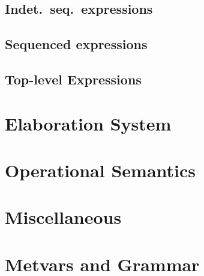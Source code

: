 \documentclass[11pt]{article}%
\newcommand{\TODO}[1]{}
\begin{document}
\subsection{Indet.\ seq.\ expressions}
\cndefnsexplXXisXXexpr%

\subsection{Sequenced expressions}
\cndefnsexplXXseqXXexpr%

\subsection{Top-level Expressions}
\cndefnsexplXXtop%

\section{Elaboration System}
\cndefnsinfXXres%
\cndefnselabXXisXXexpr%
\cndefnselabXXspine%
\cndefnselabXXseqXXexpr%
\cndefnselabXXtop%

\section{Operational Semantics}
\cndefnssubsXXjudge%
\cndefnspureXXopsemXXdefns%
\cndefnsopsemXXdefns%

\section{Miscellaneous}
\cndefnsproofXXdefns%
\cndefnsspecXXdefns%
\cndefnsheapXXsat

\section{Metvars and Grammar}
\cnmetavars\\[\baselineskip]
\cngrammar%
\end{document}
